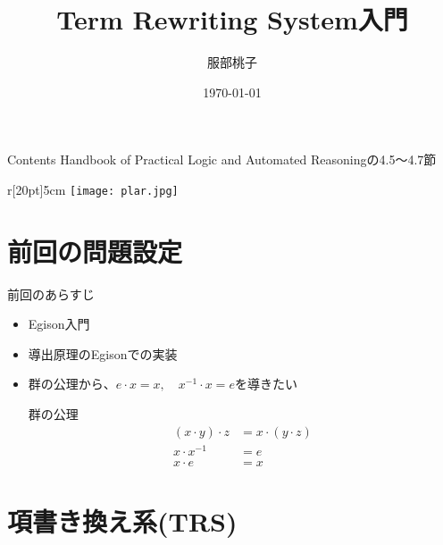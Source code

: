 \documentclass[dvipdfmx,11pt,notheorems]{beamer}
\title[]{Term Rewriting System入門}%
\author[]{服部桃子}%
\date{\today}%
\theoremstyle{definition}
\begin{document}
\begin{frame}[plain]\frametitle{}
\titlepage %
\end{frame}

\begin{frame}{Contents}
  Handbook of Practical Logic and Automated Reasoningの4.5〜4.7節
  \begin{wrapfigure}{r}[20pt]{5cm}
    \texttt{[image: plar.jpg]}
  \end{wrapfigure}

  \tableofcontents %
\end{frame}

\section{前回の問題設定}
\begin{frame}{前回のあらすじ}
  \begin{itemize}
    \item Egison入門
    \item 導出原理のEgisonでの実装
    \item 群の公理から、$e\cdot x = x,\quad x^{-1} \cdot x = e$を導きたい
    \begin{exampleblock}{群の公理}
      \vspace{-10pt}
      \begin{align*}
        (x \cdot y) \cdot z &= x \cdot (y \cdot z) \\
        x \cdot x^{-1} &= e \\
        x \cdot e &= x
      \end{align*}
    \end{exampleblock}
  \end{itemize}
\end{frame}

\section{項書き換え系(TRS)}
\end{document}
